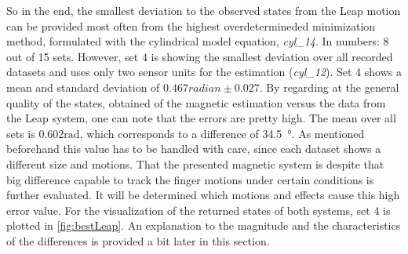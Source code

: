 So in the end, the smallest deviation to the observed states from the Leap motion can be provided most often from the highest overdetermineded minimization method, formulated with the cylindrical model equation, \emph{cyl\_14}. In numbers: 8 out of 15 sets. However, set 4 is showing the smallest deviation over all recorded datasets and uses only two sensor units for the estimation (\emph{cyl\_12}). Set 4 shows a mean and standard deviation of $ 0.467 \si{radian} \pm 0.027 $. By regarding at the general quality of the states, obtained of the magnetic estimation versus the data from the Leap system, one can note that the errors are pretty high. The mean over all sets is $ 0.602 \si{\radian} $, which corresponds to a difference of \SI{34.5}{\degree}. As mentioned beforehand this value has to be handled with care, since each dataset shows a different size and motions. That the presented magnetic system is despite that big difference capable to track the finger motions under certain conditions is further evaluated. It will be determined which motions and effects cause this high error value. For the visualization of the returned states of both systems, set 4 is plotted in \ref{fig:bestLeap}. An explanation to the magnitude and the characteristics of the differences is provided a bit later in this section. 

